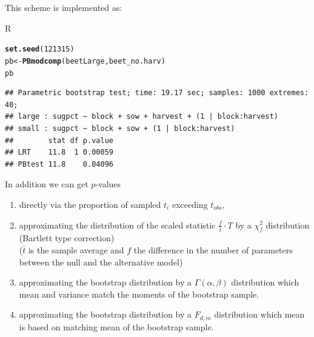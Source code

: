 \documentclass[compress]{beamer}\usepackage[]{graphicx}\usepackage[]{color}
\makeatletter
\newcommand{\hlnum}[1]{\textcolor[rgb]{0.686,0.059,0.569}{#1}}%
\newcommand{\hlstd}[1]{\textcolor[rgb]{0.345,0.345,0.345}{#1}}%
\newcommand{\hlkwb}[1]{\textcolor[rgb]{0.69,0.353,0.396}{#1}}%
\newcommand{\hlkwd}[1]{\textcolor[rgb]{0.737,0.353,0.396}{\textbf{#1}}}%
\newenvironment{kframe}{%
 \def\at@end@of@kframe{}%
 \ifinner\ifhmode%
  \def\at@end@of@kframe{\end{minipage}}%
  \begin{minipage}{\columnwidth}%
 \fi\fi%
 \def\FrameCommand##1{\hskip\@totalleftmargin \hskip-\fboxsep
 \colorbox{shadecolor}{##1}\hskip-\fboxsep
     \hskip-\linewidth \hskip-\@totalleftmargin \hskip\columnwidth}%
 \MakeFramed {\advance\hsize-\width
   \@totalleftmargin\z@ \linewidth\hsize
   \@setminipage}}%
 {\par\unskip\endMakeFramed%
 \at@end@of@kframe}
\newenvironment{knitrout}{}{} %
\newenvironment{sframe}
{\begin{frame} [containsverbatim] }
  {\end{frame}}
\newenvironment{sblock}
{\begin{block}{R}}
  {\end{block}}
\makeatother
\begin{document}
\begin{sframe}

  This scheme is implemented as:

\begin{sblock}
\begin{knitrout}\tiny
{}\color{fgcolor}\begin{kframe}
\begin{alltt}
\hlkwd{set.seed}\hlstd{(}\hlnum{121315}\hlstd{)}
\hlstd{pb} \hlkwb{<-} \hlkwd{PBmodcomp}\hlstd{(beetLarge, beet_no.harv)}
\hlstd{pb}
\end{alltt}
\begin{verbatim}
## Parametric bootstrap test; time: 19.17 sec; samples: 1000 extremes: 40;
## large : sugpct ~ block + sow + harvest + (1 | block:harvest)
## small : sugpct ~ block + sow + (1 | block:harvest)
##        stat df p.value
## LRT    11.8  1 0.00059
## PBtest 11.8    0.04096
\end{verbatim}
\end{kframe}
\end{knitrout}
\end{sblock}  
\end{sframe}

\begin{sframe}

In addition we can get $p$-values
  
  \begin{enumerate}
\item
directly via the proportion of sampled $t_i$ exceeding $t_{obs}$, 
\item
  approximating the distribution of the scaled statistic $\frac{f}{\bar t}\cdot T$ by
  a  $\chi^2_f$ distribution (Bartlett type correction)\\
  ($\bar t$ is the sample average  and $f$ the difference in the number of parameters
  between the null and the alternative model)  
\item
  approximating the bootstrap distribution by a $\Gamma(\alpha,\beta)$ distribution
  which mean and variance match the moments of the bootstrap sample.
\item 
  approximating the bootstrap distribution by a $F_{d,m}$ distribution
  which mean is based on matching mean of  the bootstrap sample.
\end{enumerate}

\end{sframe}
\end{document}
